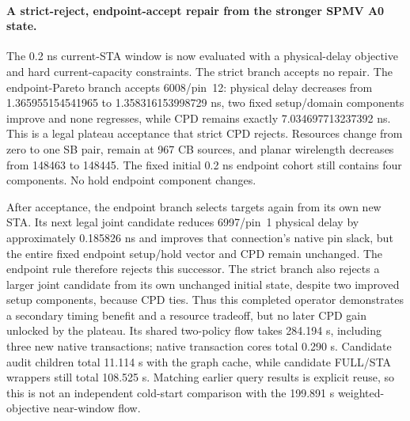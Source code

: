 \paragraph{A strict-reject, endpoint-accept repair from the stronger SPMV A0 state.}
The 0.2 ns current-STA window is now evaluated with a physical-delay objective and hard current-capacity constraints. The strict branch accepts no repair. The endpoint-Pareto branch accepts 6008/pin~12: physical delay decreases from 1.365955154541965 to 1.358316153998729 ns, two fixed setup/domain components improve and none regresses, while CPD remains exactly 7.034697713237392 ns. This is a legal plateau acceptance that strict CPD rejects. Resources change from zero to one SB pair, remain at 967 CB sources, and planar wirelength decreases from 148463 to 148445. The fixed initial 0.2 ns endpoint cohort still contains four components. No hold endpoint component changes.

After acceptance, the endpoint branch selects targets again from its own new STA. Its next legal joint candidate reduces 6997/pin~1 physical delay by approximately 0.185826 ns and improves that connection's native pin slack, but the entire fixed endpoint setup/hold vector and CPD remain unchanged. The endpoint rule therefore rejects this successor. The strict branch also rejects a larger joint candidate from its own unchanged initial state, despite two improved setup components, because CPD ties. Thus this completed operator demonstrates a secondary timing benefit and a resource tradeoff, but no later CPD gain unlocked by the plateau. Its shared two-policy flow takes 284.194 s, including three new native transactions; native transaction cores total 0.290 s. Candidate audit children total 11.114 s with the graph cache, while candidate FULL/STA wrappers still total 108.525 s. Matching earlier query results is explicit reuse, so this is not an independent cold-start comparison with the 199.891 s weighted-objective near-window flow.

